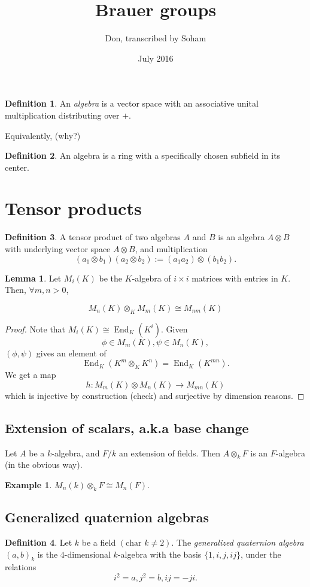 \documentclass{article}
\title{Brauer groups}
\author{Don, transcribed by Soham}
\date{July 2016}
\DeclareMathOperator{\End}{End}
\theoremstyle{definition}
\newtheorem*{lem}{Lemma}
\newtheorem*{example}{Example}
\newtheorem*{defn}{Definition}
\begin{document}
\maketitle
 
\begin{defn}
 An \textit{algebra} is a vector space with an associative unital multiplication
 distributing over $+$.
\end{defn}

Equivalently, (why?)

\begin{defn}
 An algebra is a ring with a specifically chosen subfield in its center. 
\end{defn}

\section{Tensor products}
\begin{defn}
 A tensor product of two algebras $A$ and $B$ is an algebra $A\otimes B$ with
 underlying vector space $A\otimes B$, and multiplication
$$(a_1\otimes b_1)(a_2\otimes b_2) := (a_1a_2)\otimes(b_1b_2).$$
\end{defn}

\begin{lem}
 Let $M_i(K)$ be the $K$-algebra of $i\times i$ matrices with entries in $K$.
 Then, $\forall m, n>0$,

 $$M_n(K)\otimes_K M_m(K) \cong M_{nm}(K)$$
\end{lem}
\begin{proof}
  Note that $M_i(K) \cong \End_K(K^i)$. Given
  $$\phi\in M_m(K),\psi\in M_n(K),$$
  $(\phi,\psi)$ gives an element of
  $$\End_K(K^m\otimes_K K^n) = \End_K(K^{mn}).$$ We get a map
  $$h:M_m(K)\otimes M_n(K) \to M_{mn}(K)$$
  which is injective by construction (check) and surjective by dimension reasons.
\end{proof}

\subsection{Extension of scalars, a.k.a base change}
Let $A$ be a $k$-algebra, and $F/k$ an extension of fields. Then $A\otimes_k F$
is an $F$-algebra (in the obvious way). 

\begin{example}
 $M_n(k)\otimes_k F \cong M_n(F).$ 
\end{example}

\subsection{Generalized quaternion algebras}
\begin{defn}
 Let $k$ be a field $(\text{char } k \neq 2)$. The \textit{generalized quaternion
   algebra} $(a,b)_k$ is the $4$-dimensional $k$-algebra with the basis
 $\{1,i,j,ij\}$, under the relations
 $$i^2 =a, j^2=b,ij=-ji.$$
\end{defn}
\end{document}
